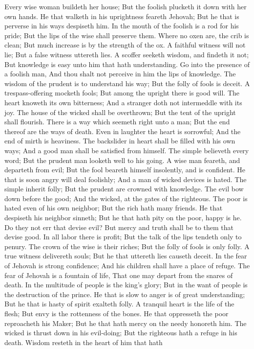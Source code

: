 Every wise woman buildeth her house; But the foolish plucketh it down with her own hands.  He that walketh in his uprightness feareth Jehovah; But he that is perverse in his ways despiseth him.  In the mouth of the foolish is a rod for his pride; But the lips of the wise shall preserve them.  Where no oxen are, the crib is clean; But much increase is by the strength of the ox.  A faithful witness will not lie; But a false witness uttereth lies.  A scoffer seeketh wisdom, and findeth it not; But knowledge is easy unto him that hath understanding.  Go into the presence of a foolish man, And thou shalt not perceive in him the lips of knowledge.  The wisdom of the prudent is to understand his way; But the folly of fools is deceit.  A trespass-offering mocketh fools; But among the upright there is good will.  The heart knoweth its own bitterness; And a stranger doth not intermeddle with its joy.  The house of the wicked shall be overthrown; But the tent of the upright shall flourish.  There is a way which seemeth right unto a man; But the end thereof are the ways of death.  Even in laughter the heart is sorrowful; And the end of mirth is heaviness.  The backslider in heart shall be filled with his own ways; And a good man shall be satisfied from himself.  The simple believeth every word; But the prudent man looketh well to his going.  A wise man feareth, and departeth from evil; But the fool beareth himself insolently, and is confident.  He that is soon angry will deal foolishly; And a man of wicked devices is hated.  The simple inherit folly; But the prudent are crowned with knowledge.  The evil bow down before the good; And the wicked, at the gates of the righteous.  The poor is hated even of his own neighbor; But the rich hath many friends.  He that despiseth his neighbor sinneth; But he that hath pity on the poor, happy is he.  Do they not err that devise evil? But mercy and truth shall be to them that devise good.  In all labor there is profit; But the talk of the lips tendeth only to penury.  The crown of the wise is their riches; But the folly of fools is only folly.  A true witness delivereth souls; But he that uttereth lies causeth deceit.  In the fear of Jehovah is strong confidence; And his children shall have a place of refuge.  The fear of Jehovah is a fountain of life, That one may depart from the snares of death.  In the multitude of people is the king’s glory; But in the want of people is the destruction of the prince.  He that is slow to anger is of great understanding; But he that is hasty of spirit exalteth folly.  A tranquil heart is the life of the flesh; But envy is the rottenness of the bones.  He that oppresseth the poor reproacheth his Maker; But he that hath mercy on the needy honoreth him.  The wicked is thrust down in his evil-doing; But the righteous hath a refuge in his death.  Wisdom resteth in the heart of him that hath 